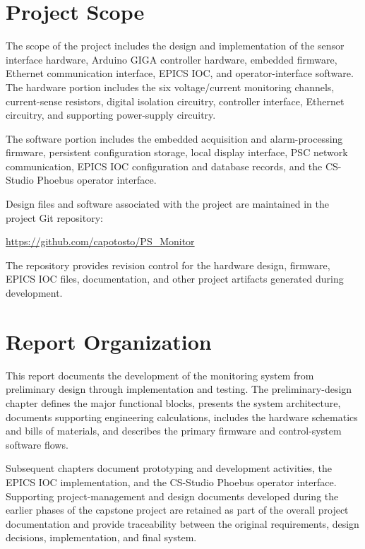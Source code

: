 \section{Project Scope}

The scope of the project includes the design and implementation of the sensor
interface hardware, Arduino GIGA controller hardware, embedded firmware,
Ethernet communication interface, EPICS IOC, and operator-interface software.
The hardware portion includes the six voltage/current monitoring channels,
current-sense resistors, digital isolation circuitry, controller interface,
Ethernet circuitry, and supporting power-supply circuitry.

The software portion includes the embedded acquisition and alarm-processing
firmware, persistent configuration storage, local display interface, PSC
network communication, EPICS IOC configuration and database records, and the
CS-Studio Phoebus operator interface.

Design files and software associated with the project are maintained in the
project Git repository:

\begin{center}
    \url{https://github.com/capotosto/PS_Monitor}
\end{center}

The repository provides revision control for the hardware design, firmware,
EPICS IOC files, documentation, and other project artifacts generated during
development.


\section{Report Organization}

This report documents the development of the monitoring system from preliminary
design through implementation and testing. The preliminary-design chapter
defines the major functional blocks, presents the system architecture,
documents supporting engineering calculations, includes the hardware
schematics and bills of materials, and describes the primary firmware and
control-system software flows.

Subsequent chapters document prototyping and development activities, the EPICS
IOC implementation, and the CS-Studio Phoebus operator interface. Supporting
project-management and design documents developed during the earlier phases of
the capstone project are retained as part of the overall project documentation
and provide traceability between the original requirements, design decisions,
implementation, and final system.